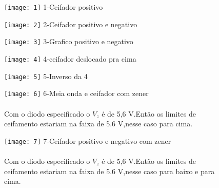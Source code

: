 \documentclass[11pt,a4paper]{article}
\begin{document}
\begin{figure}[!htb]
\texttt{[image: 1]}
1-Ceifador positivo \\
\end{figure} 
\begin{figure}[!htb]
\texttt{[image: 2]}
2-Ceifador positivo e negativo \\
\end{figure} 
\begin{figure}[!htb]
\texttt{[image: 3]}
3-Grafico positivo e negativo \\
\end{figure} 
\begin{figure}[!htb]
\texttt{[image: 4]}
4-ceifador deslocado pra cima \\
\end{figure} 
\begin{figure}[!htb]
\texttt{[image: 5]}
5-Inverso da 4 \\
\end{figure} 
\begin{figure}[!htb]
\texttt{[image: 6]}
6-Meia onda e ceifador com zener \\
\\Com o diodo especificado o $V_z$ é de 5,6 V.Então os limites de ceifamento estariam na faixa de 5.6 V,nesse caso para cima.
\end{figure} 
\begin{figure}[!htb]
\texttt{[image: 7]}
7-Ceifador positivo e negativo com zener \\
\\Com o diodo especificado o $V_z$ é de 5,6 V.Então os limites de ceifamento estariam na faixa de 5.6 V,nesse caso para baixo e para cima.
\end{figure} 
\end{document}
